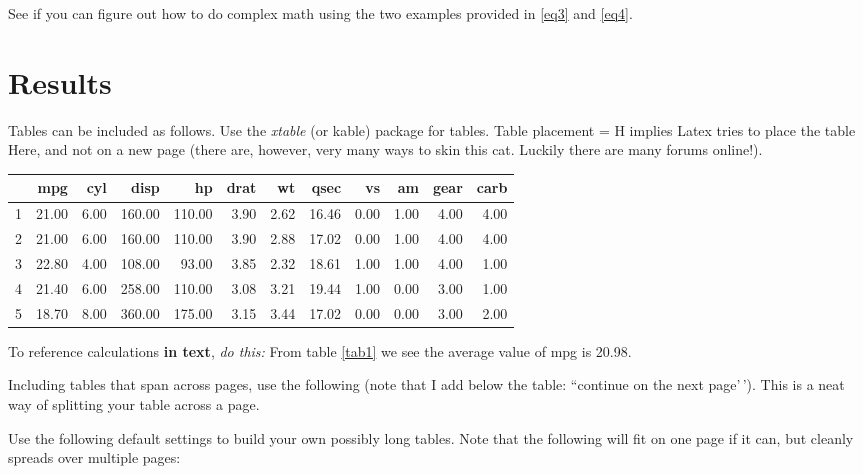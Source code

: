 \documentclass[11pt,preprint, authoryear]{elsarticle}
\let\origtable\table
\let\endorigtable\endtable
\renewenvironment{table}[1][2] {
    \expandafter\origtable\expandafter[H]
} {
    \endorigtable
}
\numberwithin{equation}{section}
\numberwithin{figure}{section}
\numberwithin{table}{section}
\begin{document}
See if you can figure out how to do complex math using the two examples
provided in \ref{eq3} and \ref{eq4}.

\hypertarget{results}{%
\section{Results}\label{results}}

Tables can be included as follows. Use the \emph{xtable} (or kable)
package for tables. Table placement = H implies Latex tries to place the
table Here, and not on a new page (there are, however, very many ways to
skin this cat. Luckily there are many forums online!).

\begin{table}[H]
\centering
\begin{tabular}{rrrrrrrrrrrr}
  \hline
 & mpg & cyl & disp & hp & drat & wt & qsec & vs & am & gear & carb \\ 
  \hline
1 & 21.00 & 6.00 & 160.00 & 110.00 & 3.90 & 2.62 & 16.46 & 0.00 & 1.00 & 4.00 & 4.00 \\ 
  2 & 21.00 & 6.00 & 160.00 & 110.00 & 3.90 & 2.88 & 17.02 & 0.00 & 1.00 & 4.00 & 4.00 \\ 
  3 & 22.80 & 4.00 & 108.00 & 93.00 & 3.85 & 2.32 & 18.61 & 1.00 & 1.00 & 4.00 & 1.00 \\ 
  4 & 21.40 & 6.00 & 258.00 & 110.00 & 3.08 & 3.21 & 19.44 & 1.00 & 0.00 & 3.00 & 1.00 \\ 
  5 & 18.70 & 8.00 & 360.00 & 175.00 & 3.15 & 3.44 & 17.02 & 0.00 & 0.00 & 3.00 & 2.00 \\ 
   \hline
\end{tabular}
\caption{Short Table Example \label{tab1}} 
\end{table}

To reference calculations \textbf{in text}, \emph{do this:} From table
\ref{tab1} we see the average value of mpg is 20.98.

Including tables that span across pages, use the following (note that I
add below the table: ``continue on the next page'\,'). This is a neat
way of splitting your table across a page.

Use the following default settings to build your own possibly long
tables. Note that the following will fit on one page if it can, but
cleanly spreads over multiple pages:
\end{document}
